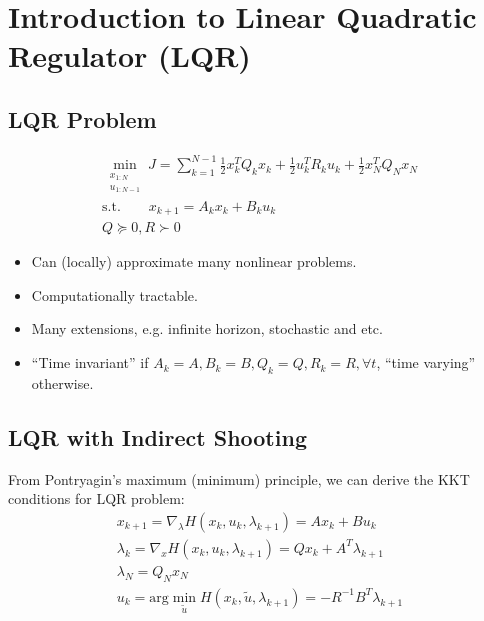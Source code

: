 \section{Introduction to Linear Quadratic Regulator (LQR)}
\subsection{LQR Problem}
\begin{equation}
    \begin{aligned}
        \min_{\substack{x_{1:N}\\u_{1:N-1}}}J=\sum_{k=1}^{N-1}{\frac{1}{2}x_{k}^{T}Q_kx_k+\frac{1}{2}u_{k}^{T}R_ku_k}+\frac{1}{2}x_{N}^{T}Q_Nx_N \\
        \text{s.t.} \qquad x_{k+1} = A_k x_k + B_k u_k \\
        Q \succeq 0, R \succ 0 
    \end{aligned}
\end{equation}
\begin{itemize}
    \item Can (locally) approximate many nonlinear problems.
    \item Computationally tractable.
    \item Many extensions, e.g. infinite horizon, stochastic and etc.
    \item ``Time invariant'' if $A_k =A, B_k =B, Q_k=Q, R_k=R, \forall t$, ``time varying'' otherwise.
\end{itemize}

\subsection{LQR with Indirect Shooting}

From Pontryagin's maximum (minimum) principle, we can derive the KKT conditions for LQR problem:
\begin{equation}
    \begin{aligned}
        x_{k+1}=\nabla _{\lambda}H\left( x_k,u_k,\lambda _{k+1} \right) =Ax_k+Bu_k\\
        \lambda _k=\nabla _xH\left( x_k,u_k,\lambda _{k+1} \right) =Qx_k+A^T\lambda _{k+1}\\
        \lambda _N=Q_Nx_N\\
        u_k=\text{arg}\min _{\tilde{u}}H\left( x_k,\tilde{u},\lambda _{k+1} \right) = -R^{-1}B^T\lambda_{k+1}\\
    \end{aligned}
\end{equation}

